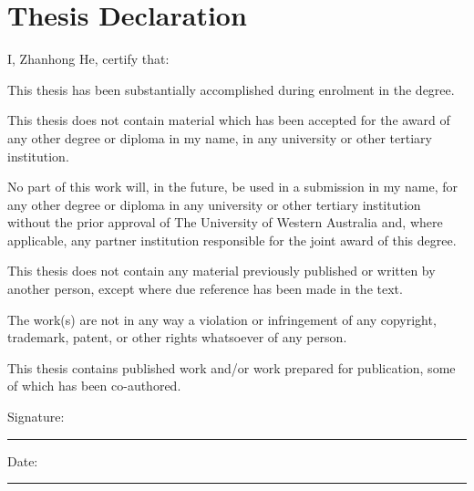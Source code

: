 \section*{\Large Thesis Declaration}
\vskip 0.8cm
\begin{flushleft}
I, Zhanhong He, certify that:

\vskip 0.5cm
This thesis has been substantially accomplished during enrolment in the degree.

\vskip 0.25cm
This thesis does not contain material which has been accepted for the award of any other degree or diploma in my name, in any university or other tertiary institution.

\vskip 0.25cm
No part of this work will, in the future, be used in a submission in my name, for any other degree or diploma in any university or other tertiary institution without the prior approval of The University of Western Australia and, where applicable, any partner institution responsible for the joint award of this degree.

\vskip 0.25cm
This thesis does not contain any material previously published or written by another person, except where due reference has been made in the text.

\vskip 0.25cm
The work(s) are not in any way a violation or infringement of any copyright, trademark, patent, or other rights whatsoever of any person.



\vskip 0.25cm
This thesis contains published work and/or work prepared for publication, some of which has been co-authored.

\vskip 0.8cm
Signature: \rule{5cm}{0.4pt}\hfill Date: \rule{4cm}{0.4pt}
\end{flushleft}
